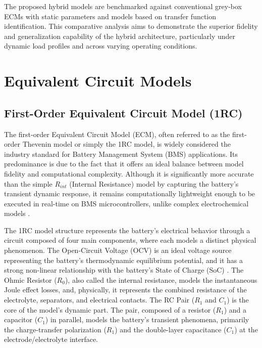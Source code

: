 \documentclass[lettersize,journal]{IEEEtran}
\begin{document}
The proposed hybrid models are benchmarked against conventional grey-box ECMs with static parameters and models based on transfer function identification. This comparative analysis aims to demonstrate the superior fidelity and generalization capability of the hybrid architecture, particularly under dynamic load profiles and across varying operating conditions.

\section{Equivalent Circuit Models}

\subsection{First-Order Equivalent Circuit Model (1RC)}

The first-order Equivalent Circuit Model (ECM), often referred to as the first-order Thevenin model or simply the 1RC model, is widely considered the industry standard for Battery Management System (BMS) applications\cite{tekin2024comparative}. Its predominance is due to the fact that it offers an ideal balance between model fidelity and computational complexity. Although it is significantly more accurate than the simple $R_{int}$ (Internal Resistance) model by capturing the battery's transient dynamic response, it remains computationally lightweight enough to be executed in real-time on BMS microcontrollers, unlike complex electrochemical models \cite{mawuntu2023modeling}.

The 1RC model structure represents the battery's electrical behavior through a circuit composed of four main components, where each models a distinct physical phenomenon. The Open-Circuit Voltage (OCV) is an ideal voltage source representing the battery's thermodynamic equilibrium potential, and it has a strong non-linear relationship with the battery's State of Charge (SoC) \cite{tran2021comprehensive}. The Ohmic Resistor ($R_0$), also called the internal resistance, models the instantaneous Joule effect losses, and, physically, it represents the combined resistance of the electrolyte, separators, and electrical contacts. The RC Pair ($R_1$ and $C_1$) is the core of the model's dynamic part. The pair, composed of a resistor ($R_1$) and a capacitor ($C_1$) in parallel, models the battery's transient phenomena, primarily the charge-transfer polarization ($R_1$) and the double-layer capacitance ($C_1$) at the electrode/electrolyte interface.
\end{document}

